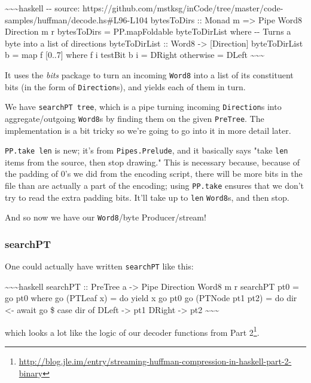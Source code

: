 \documentclass[]{article}
\renewcommand{\href}[2]{#2\footnote{\url{#1}}}
\begin{document}
\textasciitilde{}\textasciitilde{}\textasciitilde{}haskell -\/- source:
https://github.com/mstksg/inCode/tree/master/code-samples/huffman/decode.hs\#L96-L104
bytesToDirs :: Monad m =\textgreater{} Pipe Word8 Direction m r bytesToDirs =
PP.mapFoldable byteToDirList where -\/- Turns a byte into a list of directions
byteToDirList :: Word8 -\textgreater{} {[}Direction{]} byteToDirList b = map f
{[}0..7{]} where f i \textbar{} testBit b i = DRight \textbar{} otherwise =
DLeft \textasciitilde{}\textasciitilde{}\textasciitilde{}

It uses the \emph{bits} package to turn an incoming \texttt{Word8} into a list
of its constituent bits (in the form of \texttt{Direction}s), and yields each of
them in turn.

We have \texttt{searchPT\ tree}, which is a pipe turning incoming
\texttt{Direction}s into aggregate/outgoing \texttt{Word8}s by finding them on
the given \texttt{PreTree}. The implementation is a bit tricky so we're going to
go into it in more detail later.

\texttt{PP.take\ len} is new; it's from \texttt{Pipes.Prelude}, and it basically
says "take \texttt{len} items from the source, then stop drawing." This is
necessary because, because of the padding of 0's we did from the encoding
script, there will be more bits in the file than are actually a part of the
encoding; using \texttt{PP.take} ensures that we don't try to read the extra
padding bits. It'll take up to \texttt{len} \texttt{Word8}s, and then stop.

And so now we have our \texttt{Word8}/byte Producer/stream!

\subsubsection{searchPT}

One could actually have written \texttt{searchPT} like this:

\textasciitilde{}\textasciitilde{}\textasciitilde{}haskell searchPT :: PreTree a
-\textgreater{} Pipe Direction Word8 m r searchPT pt0 = go pt0 where go (PTLeaf
x) = do yield x go pt0 go (PTNode pt1 pt2) = do dir \textless{}- await go \$
case dir of DLeft -\textgreater{} pt1 DRight -\textgreater{} pt2
\textasciitilde{}\textasciitilde{}\textasciitilde{}

which looks a lot like the logic of our decoder functions from
\href{http://blog.jle.im/entry/streaming-huffman-compression-in-haskell-part-2-binary}{Part
2}.
\end{document}
